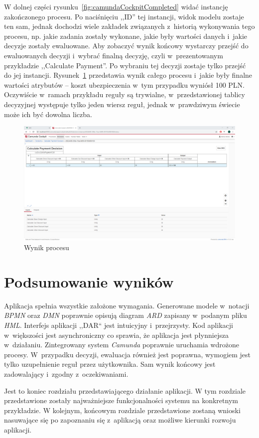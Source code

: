 W dolnej części rysunku~\ref{fig:camundaCockpitCompleted} widać instancję zakończonego procesu. Po naciśnięciu ,,ID'' tej instancji, widok modelu zostaje ten sam, jednak dochodzi wiele zakładek związanych z~historią wykonywania tego procesu, np. jakie zadania zostały wykonane, jakie były wartości danych i~jakie decyzje zostały ewaluowane. Aby zobaczyć wynik końcowy wystarczy przejść do ewaluowanych decyzji i~wybrać finalną decyzję, czyli w~prezentowanym przykładzie ,,Calculate Payment''. Po wybraniu tej decyzji zostaje tylko przejść do jej instancji. Rysunek~\ref{fig:camundaCockpitFinal} przedstawia wynik całego procesu i~jakie były finalne wartości atrybutów -- koszt ubezpieczenia w~tym przypadku wyniósł 100 PLN. Oczywiście w~ramach przykładu reguły są trywialne, w~przedstawionej tablicy decyzyjnej występuje tylko jeden wiersz reguł, jednak w~prawdziwym świecie może ich być dowolna liczba.
\begin{figure}
    \centering
    \includegraphics[width=\textwidth]{./assets/camundaCockpitFinal.png}
    \caption{Wynik procesu}
    \label{fig:camundaCockpitFinal}
\end{figure}
\vspace{-6mm}
\section{Podsumowanie wyników}
\label{sec:podsumowanieWyników}
Aplikacja spełnia wszystkie założone wymagania. Generowane modele w~notacji \emph{BPMN} oraz \emph{DMN} poprawnie opisują diagram \emph{ARD} zapisany w~podanym pliku \emph{HML}. Interfejs aplikacji ,,DAR`` jest intuicyjny i~przejrzysty. Kod aplikacji w~większości jest asynchroniczny co sprawia, że aplikacja jest płynniejsza w~działaniu. Zintegrowany system \emph{Camunda} poprawnie uruchamia wdrożone procesy. W~przypadku decyzji, ewaluacja również jest poprawna, wymogiem jest tylko uzupełnienie reguł przez użytkownika. Sam wynik końcowy jest zadowalający i~zgodny z~oczekiwaniami.
\vspace{4mm}

Jest to koniec rozdziału przedstawiającego działanie aplikacji. W tym rozdziale przedstawione zostały najważniejsze funkcjonalności systemu na konkretnym przykładzie. W kolejnym, końcowym rozdziale przedstawione zostaną wnioski nasuwające się po zapoznaniu się z~aplikacją oraz możliwe kierunki rozwoju aplikacji. 


